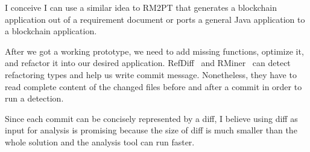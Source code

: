 I conceive I can use a similar idea to RM2PT that generates a blockchain application out of a requirement document or ports a general Java application to a blockchain application.

After we got a working prototype, we need to add missing functions, optimize it, and refactor it into our desired application.
RefDiff~\cite{silva2020refdiff} and RMiner~\cite{tsantalis2018accurate} can detect refactoring types and help us write commit message. Nonetheless, they have to read complete content of the changed files before and after a commit in order to run a detection.

Since each commit can be concisely represented by a diff, I believe using diff as input for analysis is promising because the size of diff is much smaller than the whole solution and the analysis tool can run faster.